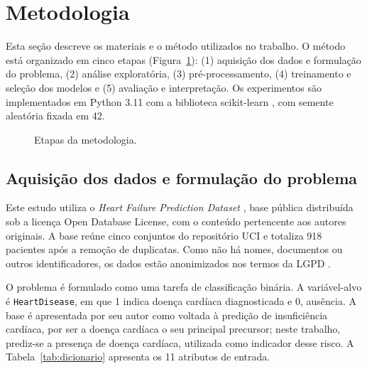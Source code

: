 \documentclass[12pt]{article}
\begin{document}
\section{Metodologia}
\label{sec:metodologia}

Esta seção descreve os materiais e o método utilizados no trabalho. O método
está organizado em cinco etapas (Figura~\ref{fig:etapas}): (1) aquisição dos
dados e formulação do problema, (2) análise exploratória, (3)
pré-processamento, (4) treinamento e seleção dos modelos e (5) avaliação e
interpretação. Os experimentos são implementados em Python 3.11 com a
biblioteca scikit-learn \cite{pedregosa:11}, com semente aleatória fixada em
42.

\begin{figure}[!htb]
\centering
\scriptsize
{}
\caption{Etapas da metodologia.}
\label{fig:etapas}
\end{figure}

\subsection{Aquisição dos dados e formulação do problema}

Este estudo utiliza o \textit{Heart Failure Prediction Dataset}
\cite{fedesoriano:21}, base pública distribuída sob a licença Open Database
License, com o conteúdo pertencente aos autores originais. A base reúne cinco
conjuntos do repositório UCI \cite{janosi:89} e totaliza 918 pacientes após a
remoção de duplicatas. Como não há nomes, documentos ou outros
identificadores, os dados estão anonimizados nos termos da LGPD
\cite{lgpd:18}.

O problema é formulado como uma tarefa de classificação binária. A
variável-alvo é \texttt{HeartDisease}, em que 1 indica doença cardíaca
diagnosticada e 0, ausência. A base é apresentada por seu autor como voltada
à predição de insuficiência cardíaca, por ser a doença cardíaca o seu
principal precursor; neste trabalho, prediz-se a presença de doença cardíaca,
utilizada como indicador desse risco. A Tabela~\ref{tab:dicionario} apresenta
os 11 atributos de entrada.
\end{document}
